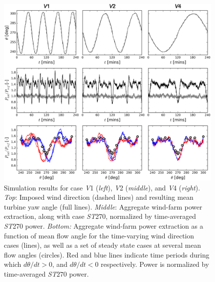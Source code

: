 		
		\begin{figure}[ht]
			\centering
			\includegraphics[width=\textwidth]{chapters/turbulent_inflow/blm/figure12.eps}
			\caption{Simulation results for case \emph{V}1 (\emph{left}), \emph{V}2 (\emph{middle}), and \emph{V}4 (\emph{right}). \emph{Top}: Imposed wind direction (dashed lines) and resulting mean turbine yaw angle (full lines). \emph{Middle}: Aggregate wind-farm power extraction, along with case \emph{ST}270, normalized by time-averaged \emph{ST}270 power. \emph{Bottom:} Aggregate wind-farm power extraction as a function of mean flow angle for the time-varying wind direction cases (lines), as well as a set of steady state cases at several mean flow angles (circles). Red and blue lines indicate time periods during which $d\theta/dt > 0 $, and $d\theta/dt < 0$ respectively. Power is normalized by time-averaged \emph{ST}$270$ power.}
			\label{fig:timeyaw_timepower}
		\end{figure}
		
